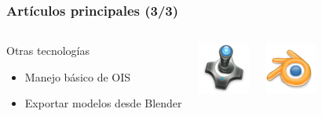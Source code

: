 \documentclass[green]{beamer}
\begin{document}
\begin{frame}
\transdissolve
    \frametitle{Artículos principales (3/3)}
        
    \begin{columns}[c]
    \column{200pt}
        
	\begin{block}{Otras tecnologías}
            \begin{itemize}
                \item Manejo básico de OIS
		\item Exportar modelos desde Blender
            \end{itemize}            
        \end{block}

    \column{100pt}
        
	\begin{center}
	    \includegraphics[scale=0.5]{img/joystick.png}
	\end{center}
	
	\begin{center}
	    \includegraphics[scale=0.5]{img/blender-icono.png}
	\end{center}
    \end{columns} 
\end{frame}
\end{document}
